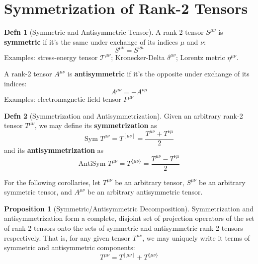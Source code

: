 \documentclass[12pt]{article}
\theoremstyle{definition}
\newtheorem{defn}{Defn}[section]
\newtheorem{prop}{Proposition}[section]
\newcommand{\sym}{\text{Sym }}
\newcommand{\antisym}{\text{AntiSym }}
\begin{document}
\section{Symmetrization of Rank-2 Tensors}

\begin{defn}[Symmetric and Antisymmetric Tensor]
    A rank-2 tensor $S^{\mu\nu}$ is \textbf{symmetric} if it's the same under exchange of its indices
    $\mu$ and $\nu$:
    \begin{equation*}
        S^{\mu\nu} = S^{\nu\mu}
    \end{equation*}
    Examples: stress-energy tensor $\mathcal{T}^{\mu\nu}$; Kronecker-Delta $\delta^{\mu\nu}$; Lorentz metric
    $\eta^{\mu\nu}$.
    
    A rank-2 tensor $A^{\mu\nu}$ is \textbf{antisymmetric} if it's the opposite under exchange of its indices:
    \begin{equation*}
        A^{\mu\nu} = -A^{\nu\mu}
    \end{equation*}
    Examples: electromagnetic field tensor $F^{\mu\nu}$
\end{defn}

\begin{defn}[Symmetrization and Antisymmetrization]
    Given an arbitrary rank-2 tensor $T^{\mu\nu}$, we may define its \textbf{symmetrization} as
    \begin{equation*}
        \sym T^{\mu\nu} = T^{[\mu\nu]} = \frac{T^{\mu\nu} + T^{\nu\mu}}{2}
    \end{equation*}
    and its \textbf{antisymmetrization} as
    \begin{equation*}
        \antisym T^{\mu\nu} = T^{\{\mu\nu\}} = \frac{T^{\mu\nu} - T^{\nu\mu}}{2}
    \end{equation*}
\end{defn}

For the following corollaries, let $T^{\mu\nu}$ be an arbitrary tensor, $S^{\mu\nu}$ be an arbitrary
symmetric tensor, and $A^{\mu\nu}$ be an arbitrary antisymmetric tensor.

\begin{prop}[Symmetric/Antisymmetric Decomposition]
    Symmetrization and antisymmetrization form a complete, disjoint set of projection operators of
    the set of rank-2 tensors onto the sets of symmetric and antisymmetric rank-2 tensors respectively.
    That is, for any given tensor $T^{\mu\nu}$, we may uniquely write it terms of symmetric and antisymmetric
    components:
    \begin{equation*}
        T^{\mu\nu} = T^{[\mu\nu]} + T^{\{\mu\nu\}}
    \end{equation*}
\end{prop}
\end{document}
